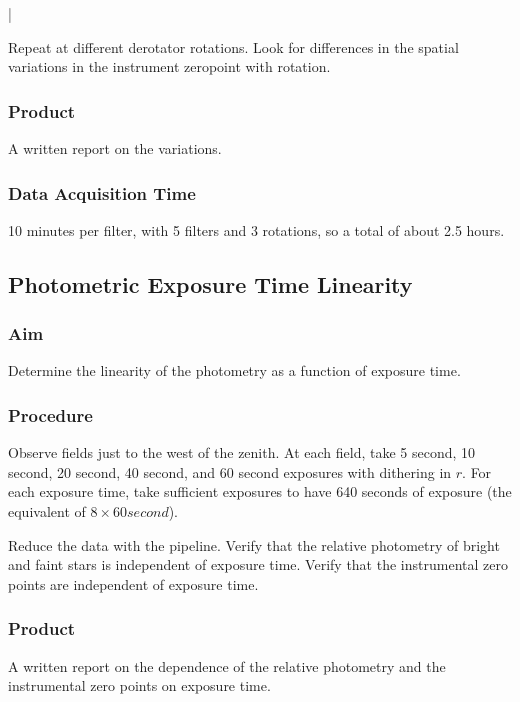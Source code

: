 |\documentclass{article}
\begin{document}
Repeat at different derotator rotations. Look for differences in the spatial variations in the instrument zeropoint with rotation.

\subsubsection{Product}

A written report on the variations.

\subsubsection{Data Acquisition Time}

10 minutes per filter, with 5 filters and 3 rotations, so a total of about 2.5 hours.


\subsection{Photometric Exposure Time Linearity}

\subsubsection{Aim}

Determine the linearity of the photometry as a function of exposure time.

\subsubsection{Procedure}

Observe fields just to the west of the zenith. At each field, take 5 second, 10 second, 20 second, 40 second, and 60 second exposures with dithering in $r$. For each exposure time, take sufficient exposures to have 640 seconds of exposure (the equivalent of $8 \times 60 second$).

Reduce the data with the pipeline. Verify that the relative photometry of bright and faint stars is independent of exposure time. Verify that the instrumental zero points are independent of exposure time.

\subsubsection{Product}

A written report on the dependence of the relative photometry and the instrumental zero points on exposure time.
\end{document}
